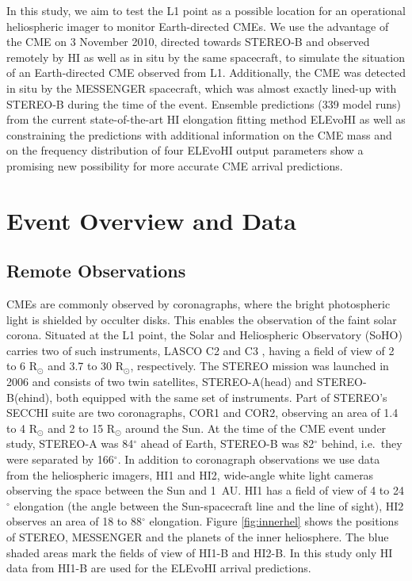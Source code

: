 \documentclass[draft]{agujournal}
\begin{document}
In this study, we aim to test the L1 point as a possible location for an operational heliospheric imager to monitor Earth-directed CMEs. We use the advantage of the CME on 3 November 2010, directed towards STEREO-B and observed remotely by HI as well as in situ by the same spacecraft, to simulate the situation of an Earth-directed CME observed from L1. Additionally, the CME was detected in situ by the MESSENGER spacecraft, which was almost exactly lined-up with STEREO-B during the time of the event. Ensemble predictions (339 model runs) from the current state-of-the-art HI elongation fitting method ELEvoHI \citep[][]{rol16} as well as constraining the predictions with additional information on the CME mass and on the frequency distribution of four ELEvoHI output parameters show a promising new possibility for more accurate CME arrival predictions.

\section{Event Overview and Data}

\subsection{Remote Observations}

CMEs are commonly observed by coronagraphs, where the bright photospheric light is shielded by occulter disks. This enables the observation of the faint solar corona. Situated at the L1 point, the Solar and Heliospheric Observatory (SoHO) carries two of such instruments, LASCO C2 and C3 \citep[][]{bru95}, having a field of view of 2 to 6 R$_\odot$ and 3.7 to 30 R$_\odot$, respectively. 
The STEREO mission was launched in 2006 and consists of two twin satellites, STEREO-A(head) and STEREO-B(ehind), both equipped with the same set of instruments. Part of STEREO's SECCHI suite \citep[][]{how08} are two coronagraphs, COR1 and COR2, observing an area of 1.4 to 4 R$_\odot$ and 2 to 15 R$_\odot$ around the Sun. At the time of the CME event under study, STEREO-A was 84$^\circ$ ahead of Earth, STEREO-B was 82$^\circ$ behind, i.e.\ they were separated by 166$^\circ$.
In addition to coronagraph observations we use data from the heliospheric imagers, HI1 and HI2, wide-angle white light cameras observing the space between the Sun and 1~AU. HI1 has a field of view of 4 to 24$^\circ$ elongation (the angle between the Sun-spacecraft line and the line of sight), HI2 observes an area of 18 to 88$^\circ$ elongation. Figure \ref{fig:innerhel} shows the positions of STEREO, MESSENGER and the planets of the inner heliosphere. The blue shaded areas mark the fields of view of HI1-B and HI2-B. In this study only HI data from HI1-B are used for the ELEvoHI arrival predictions.
\end{document}

